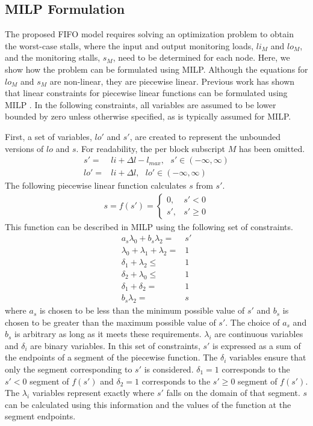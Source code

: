 \subsection{MILP Formulation}
\label{sec:monitoring_wcet.wcet.milp}

The proposed FIFO model requires solving an optimization problem to obtain the
worst-case stalls, where the input and output monitoring loads, $li_{M}$ and
$lo_{M}$, and the monitoring stalls, $s_{M}$, need to be determined for each
node. Here, we show how the problem can be formulated using MILP. Although the
equations for $lo_{M}$ and $s_{M}$ are non-linear, they are piecewise linear.
Previous work has shown that linear constraints for piecewise linear functions
can be formulated using MILP \cite{sierksma-lp}. In the following constraints,
all variables are assumed to be lower bounded by zero unless otherwise
specified, as is typically assumed for MILP.

First, a set of variables, $lo'$ and $s'$, are created to represent the
unbounded versions of $lo$ and $s$. For readability, the per block subscript
$M$ has been omitted.
\begin{align*}
  s' =& li + \Delta l - l_{max}, \text{ } s' \in (-\infty, \infty)\\
  lo' =& li + \Delta l, \text{ } lo' \in (-\infty, \infty) 
\end{align*}
The following piecewise linear function calculates $s$ from $s'$.
\begin{align*}
  s = f(s') = 
    \begin{cases} 
    0, &s' < 0\\
    s', &s' \geq 0
    \end{cases}
\end{align*}
This function can be described in MILP using the following set of constraints.
\begin{align*}
  a_s\lambda_0 + b_s\lambda_2 =& s'\\
  \lambda_0 + \lambda_1 + \lambda_2 =& 1 \\
  \delta_1 + \lambda_2 \leq& 1 \\
  \delta_2 + \lambda_0 \leq& 1 \\
  \delta_1 + \delta_2 =& 1 \\
  b_s\lambda_2 =& s
\end{align*}
where $a_s$ is chosen to be less than the minimum possible value of $s'$ and
$b_s$ is chosen to be greater than the maximum possible value of $s'$. The
choice of $a_s$ and $b_s$ is arbitrary as long as it meets these requirements.
$\lambda_i$ are continuous variables and $\delta_i$ are binary variables. In
this set of constraints, $s'$ is expressed as a sum of the endpoints of a
segment of the piecewise function. The $\delta_i$ variables ensure that only
the segment corresponding to $s'$ is considered. $\delta_1 = 1$ corresponds to
the $s' < 0$ segment of $f(s')$ and $\delta_2 = 1$ corresponds to the $s' \geq
0$ segment of $f(s')$. The $\lambda_i$ variables represent exactly where $s'$
falls on the domain of that segment. $s$ can be calculated using this
information and the values of the function at the segment endpoints.

